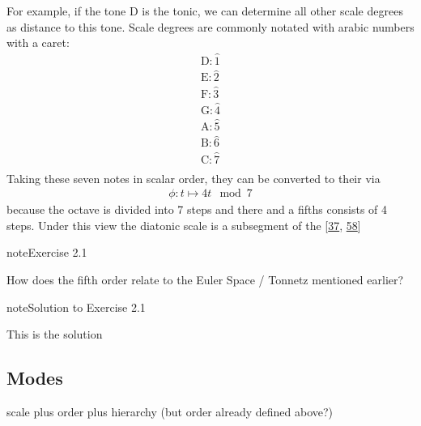 \documentclass[letterpaper,10pt,english]{sphinxmanual}
\begin{document}
\sphinxAtStartPar
For example, if the tone D is the tonic, we can determine all other scale degrees
as distance to this tone. Scale degrees are commonly notated with arabic numbers with a caret:
\begin{equation*}
\begin{split}\text{D}: \hat{1}\\
\text{E}: \hat{2}\\
\text{F}: \hat{3}\\
\text{G}: \hat{4}\\
\text{A}: \hat{5}\\
\text{B}: \hat{6}\\
\text{C}: \hat{7}\\\end{split}
\end{equation*}
\sphinxAtStartPar
Taking these seven notes in scalar order, they can be converted to their  via
\begin{equation*}
\begin{split}\phi: t \mapsto 4t \mod 7\end{split}
\end{equation*}
\sphinxAtStartPar
because the octave is divided into 7 steps and there and a fifths consists of 4 steps.
Under this view the diatonic scale is a subsegment
of the  {[}\hyperlink{cite.8_bibliography:id44}{37}, \hyperlink{cite.8_bibliography:id40}{58}{]}
 \label{exercise:ex:tonnetz}

\begin{sphinxadmonition}{note}{Exercise 2.1}



\sphinxAtStartPar
How does the fifth order relate to the Euler Space / Tonnetz mentioned earlier?
\end{sphinxadmonition}
 \label{2_scales_modes:sol:tonnetz}

\begin{sphinxadmonition}{note}{Solution to Exercise 2.1}



\sphinxAtStartPar
This is the solution
\end{sphinxadmonition}


\subsection{Modes}
\label{\detokenize{2_scales_modes:modes}}
\sphinxAtStartPar
scale plus order plus hierarchy (but order already defined above?)
\end{document}
